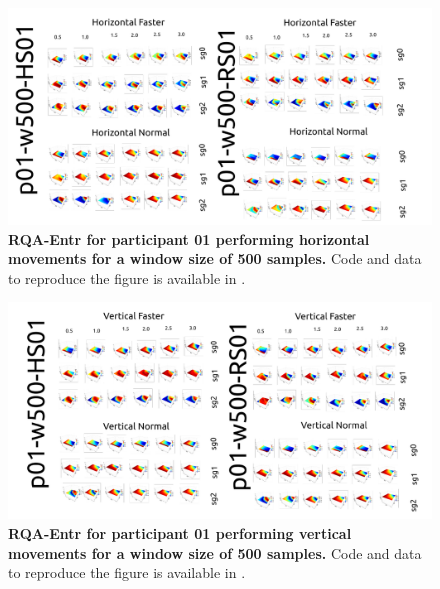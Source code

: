 \documentclass[12pt]{article}
\begin{document}


\newpage
\begin{figure}[ht!]
\centering
\includegraphics{sm-fig05}
    	\caption{
	{\bf RQA-Entr for participant 01 performing horizontal movements for a window size of 500 samples.}
	Code and data to reproduce the figure is available in \cite{srep2021}.
        }
    \label{fig-p01-H-w500}
\end{figure}
\begin{figure}[hb!]
\centering
\includegraphics{sm-fig06}
    	\caption{
	{\bf RQA-Entr for participant 01 performing vertical movements for a window size of 500 samples.}
	Code and data to reproduce the figure is available in \cite{srep2021}.
        }
    \label{fig-p01-V-w500}
\end{figure}
\end{document}
